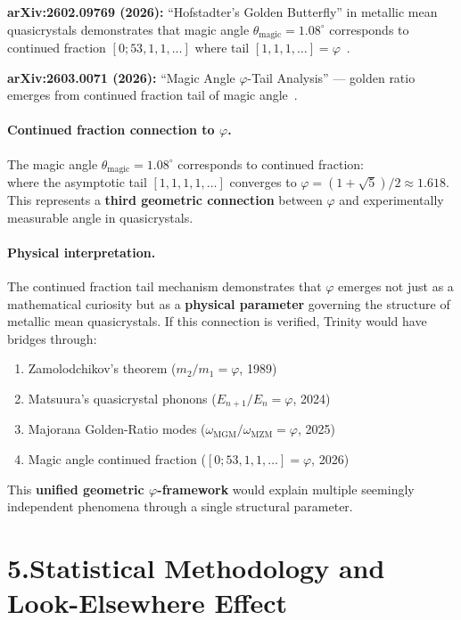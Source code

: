 \documentclass[10pt,a4paper]{article}
\begin{document}
\textbf{arXiv:2602.09769 (2026):} ``Hofstadter's Golden Butterfly'' in metallic mean quasicrystals demonstrates that magic angle $\theta_{\text{magic}} = 1.08^{\circ}$ corresponds to continued fraction $[0;53,1,1,\dots]$ where tail $[1,1,1,\dots] = \varphi$~\cite{HofstadterGoldenButterfly2026}.

\textbf{arXiv:2603.0071 (2026):} ``Magic Angle $\varphi$-Tail Analysis'' --- golden ratio emerges from continued fraction tail of magic angle~\cite{MagicAnglePhi2026}.

\paragraph{Continued fraction connection to $\varphi$.} The magic angle $\theta_{\text{magic}} = 1.08^{\circ}$ corresponds to continued fraction:
\begin{equation}
  [0; 53, 1, 1, 1, 1, 1, 1, 1, \ldots]
  \label{eq:magic_angle_cf}
\end{equation}
where the asymptotic tail $[1, 1, 1, 1, \ldots]$ converges to $\varphi = (1+\sqrt{5})/2 \approx 1.618$. This represents a \textbf{third geometric connection} between $\varphi$ and experimentally measurable angle in quasicrystals.

\paragraph{Physical interpretation.} The continued fraction tail mechanism demonstrates that $\varphi$ emerges not just as a mathematical curiosity but as a \textbf{physical parameter} governing the structure of metallic mean quasicrystals. If this connection is verified, Trinity would have bridges through:
\begin{enumerate}
  \item Zamolodchikov's theorem ($m_2/m_1 = \varphi$, 1989)
  \item Matsuura's quasicrystal phonons ($E_{n+1}/E_n = \varphi$, 2024)
  \item Majorana Golden-Ratio modes ($\omega_{\text{MGM}}/\omega_{\text{MZM}} = \varphi$, 2025)
  \item Magic angle continued fraction ($[0;53,1,1,\dots] = \varphi$, 2026)
\end{enumerate}
This \textbf{unified geometric $\varphi$-framework} would explain multiple seemingly independent phenomena through a single structural parameter.

\section*{5.\quad Statistical Methodology and Look-Elsewhere Effect}
\end{document}
